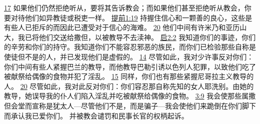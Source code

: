 \documentclass[12pt, a4paper, oneside]{ctexart}
\begin{document}
{		\href{https://biblehub.com/matthew/18-17.htm}{17} 如果他们仍然拒绝听从，要将其告诉教会；而如果他们甚至拒绝听从教会，你要对待他们如异教徒或税吏一样。
		\href{https://biblehub.com/1_timothy/1-19.htm}{提前1:19} 持握住信心和一颗善的良心，这些是有些人已拒斥的而因此已遭受对于信心的海难。
		\href{https://biblehub.com/1_timothy/1-20.htm}{20} 他们中间有许米乃和亚历山大，我已将他们交送给撒但，以被教导不去渎神。
		\href{https://biblehub.com/revelation/2-2.htm}{启2:2} 我知道你们的事迹，你们的辛劳和你们的持守。我知道你们不能容忍邪恶的族民，而你们已检验那些自称是使徒但不是的人，并已发现他们是虚假的。
		\href{https://biblehub.com/revelation/2-14.htm}{14} 尽管如此，我对少许事反对你们：你们中间有些人紧握巴兰的教导，而他教导巴勒引诱以色列人犯罪，以致他们吃了被献祭给偶像的食物并犯了淫乱。
		\href{https://biblehub.com/revelation/2-15.htm}{15} 同样，你们也有那些紧握尼哥拉主义教导的人。
		\href{https://biblehub.com/revelation/2-20.htm}{20} 尽管如此，我对此反对你们：你们容忍那自称先知的女人耶洗别。由她的教导，她误导我的仆人们陷入淫乱并吃被献祭给偶像的食物。
		\href{https://biblehub.com/revelation/3-9.htm}{3:9} 我会使那些属撒但会堂而宣称是犹太人---尽管他们不是，而是骗子---我会使他们来跪倒在你们脚下而承认我已爱你们。
	}
	并被教会谴罚和民事长官的权柄起诉。
\end{document}
